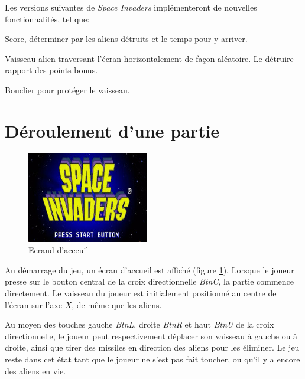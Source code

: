 \documentclass[french]{nakrule}
\begin{document}

Les versions suivantes de \emph{Space Invaders} implémenteront de nouvelles
fonctionnalités, tel que:\vspace{.1in}
\begin{items}
\item Score, déterminer par les aliens détruits et le temps pour y arriver.
\item Vaisseau alien traversant l'écran horizontalement de façon aléatoire. Le
  détruire rapport des points bonus.
\item Bouclier pour protéger le vaisseau.
\end{items}

\clearpage

\section{Déroulement d'une partie}
\label{sec:deroulementPartie}

\begin{figure}
  \centering
  \includegraphics[width=.5\textwidth]{../ROM/pictures/startScreen}
  \caption{Ecrand d'acceuil}
  \label{gameTitle}
\end{figure}

Au démarrage du jeu, un écran d'accueil est affiché (figure \ref{gameTitle}).
Lorsque le joueur presse sur le bouton central de la croix directionnelle \emph{BtnC}, la
partie commence directement. Le vaisseau du joueur est initialement positionné
au centre de l'écran sur l'axe $X$, de même que les aliens.

Au moyen des touches gauche \emph{BtnL}, droite \emph{BtnR} et haut \emph{BtnU}
de la croix directionnelle, le joueur peut respectivement déplacer son vaisseau
à gauche ou à droite, ainsi que tirer des missiles en direction des aliens pour
les éliminer. Le jeu reste dans cet état tant que le joueur ne s'est pas fait
toucher, ou qu'il y a encore des aliens en vie.
\end{document}

